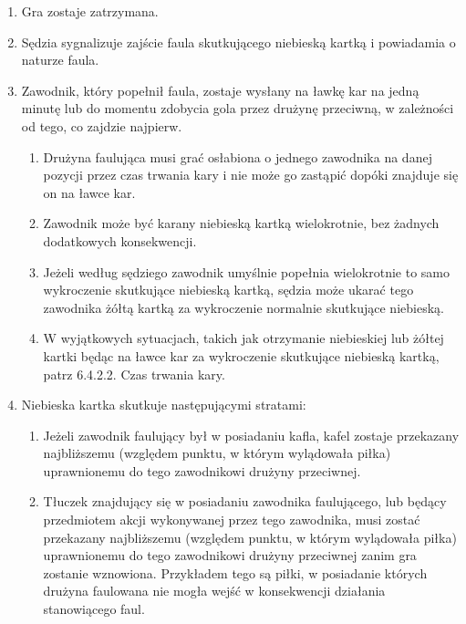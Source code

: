\documentclass[12pt]{article}
\begin{document}
\begin{enumerate}
	\item
	      Gra zostaje zatrzymana.
	\item
	      Sędzia sygnalizuje zajście faula skutkującego niebieską kartką i
	      powiadamia o naturze faula.
	\item
	      Zawodnik, który popełnił faula, zostaje wysłany na ławkę kar na jedną
	      minutę lub do momentu zdobycia gola przez drużynę przeciwną, w
	      zależności od tego, co zajdzie najpierw.

	      \begin{enumerate}
		      \item
		            Drużyna faulująca musi grać osłabiona o jednego zawodnika na danej
		            pozycji przez czas trwania kary i nie może go zastąpić dopóki
		            znajduje się on na ławce kar.
		      \item
		            Zawodnik może być karany niebieską kartką wielokrotnie, bez żadnych
		            dodatkowych konsekwencji.
		      \item
		            Jeżeli według sędziego zawodnik umyślnie popełnia wielokrotnie to
		            samo wykroczenie skutkujące niebieską kartką, sędzia może ukarać
		            tego zawodnika żółtą kartką za wykroczenie normalnie skutkujące
		            niebieską.
		      \item
		            W wyjątkowych sytuacjach, takich jak otrzymanie niebieskiej lub
		            żółtej kartki będąc na ławce kar za wykroczenie skutkujące niebieską
		            kartką, patrz 6.4.2.2. Czas trwania kary.
	      \end{enumerate}
	\item
	      Niebieska kartka skutkuje następującymi stratami:

	      \begin{enumerate}
		      \item
		            Jeżeli zawodnik faulujący był w posiadaniu kafla, kafel zostaje
		            przekazany najbliższemu (względem punktu, w którym wylądowała piłka)
		            uprawnionemu do tego zawodnikowi drużyny przeciwnej.
		      \item
		            Tłuczek znajdujący się w posiadaniu zawodnika faulującego, lub
		            będący przedmiotem akcji wykonywanej przez tego zawodnika, musi
		            zostać przekazany najbliższemu (względem punktu, w którym wylądowała
		            piłka) uprawnionemu do tego zawodnikowi drużyny przeciwnej zanim gra
		            zostanie wznowiona. Przykładem tego są piłki, w posiadanie których
		            drużyna faulowana nie mogła wejść w konsekwencji działania
		            stanowiącego faul.


\end{enumerate}
\end{enumerate}
\end{document}
